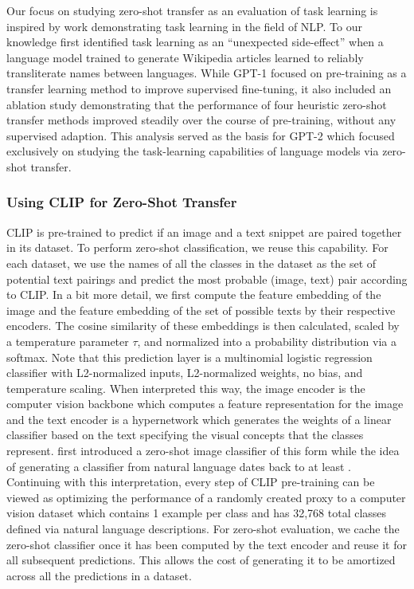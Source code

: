Our focus on studying zero-shot transfer as an evaluation of task learning is inspired by work demonstrating task learning in the field of NLP. To our knowledge \citet{liu2018generating} first identified task learning as an ``unexpected side-effect'' when a language model trained to generate Wikipedia articles learned to reliably transliterate names between languages. While GPT-1 \citep{radford2018improving} focused on pre-training as a transfer learning method to improve supervised fine-tuning, it also included an ablation study demonstrating that the performance of four heuristic zero-shot transfer methods improved steadily over the course of pre-training, without any supervised adaption. This analysis served as the basis for GPT-2 \citep{radford2019language} which focused exclusively on studying the task-learning capabilities of language models via zero-shot transfer.

\subsubsection{Using CLIP for Zero-Shot Transfer}

CLIP is pre-trained to predict if an image and a text snippet are paired together in its dataset. To perform zero-shot classification, we reuse this capability. For each dataset, we use the names of all the classes in the dataset as the set of potential text pairings and predict the most probable (image, text) pair according to CLIP. In a bit more detail, we first compute the feature embedding of the image and the feature embedding of the set of possible texts by their respective encoders. The cosine similarity of these embeddings is then calculated, scaled by a temperature parameter $\tau$, and normalized into a probability distribution via a softmax. Note that this prediction layer is a multinomial logistic regression classifier with L2-normalized inputs, L2-normalized weights, no bias, and temperature scaling. When interpreted this way, the image encoder is the computer vision backbone which computes a feature representation for the image and the text encoder is a hypernetwork \citep{ha2016hypernetworks} which generates the weights of a linear classifier based on the text specifying the visual concepts that the classes represent. \citet{lei2015predicting} first introduced a zero-shot image classifier of this form while the idea of generating a classifier from natural language dates back to at least \citet{elhoseiny2013write}. Continuing with this interpretation, every step of CLIP pre-training can be viewed as optimizing the performance of a randomly created proxy to a computer vision dataset which contains 1 example per class and has 32,768 total classes defined via natural language descriptions. For zero-shot evaluation, we cache the zero-shot classifier once it has been computed by the text encoder and reuse it for all subsequent predictions. This allows the cost of generating it to be amortized across all the predictions in a dataset.

